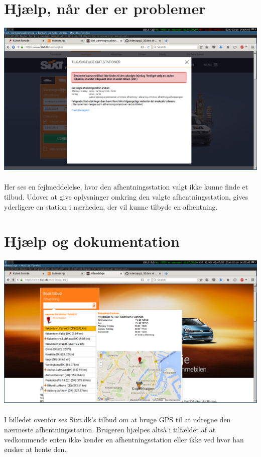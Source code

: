 \documentclass[12pt]{article}
\begin{document}
\section{Hjælp, når der er problemer}

\includegraphics[scale=0.3]{img/Udlej222}
\\
\\
Her ses en fejlmeddelelse, hvor den afhentningsstation valgt ikke kunne finde et tilbud. Udover at give oplysninger omkring den valgte afhentningsstation, gives yderligere en station i nærheden, der vil kunne tilbyde en afhentning.

\section{Hjælp og dokumentation}

\includegraphics[scale=0.3]{img/NaermesteUdlejning}
\\
\\
I billedet ovenfor ses Sixt.dk's tilbud om at bruge GPS til at udregne den nærmeste afhentningsstation. Brugeren hjælpes altså i tilfældet af at vedkommende enten ikke kender en afhentningsstation eller ikke ved hvor han ønsker at hente den.
\end{document}
